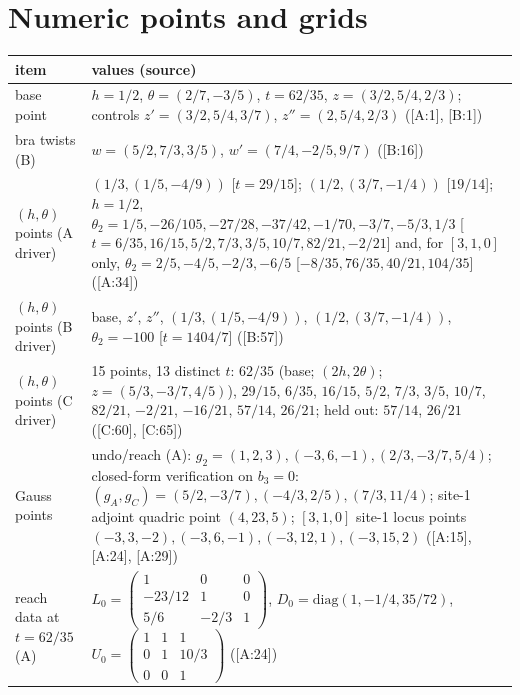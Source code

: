 \documentclass[10pt]{article}
\newcommand{\cl}[2]{\textsf{[#1:#2]}}
\begin{document}
\section{Numeric points and grids}\label{app:points}

\begin{center}\small\setlength{\tabcolsep}{3pt}\begin{longtable}{@{}p{3.2cm}p{13.2cm}@{}}\toprule
\textbf{item} & \textbf{values (source)} \\\midrule\endhead
base point & $h=1/2$, $\theta=(2/7,-3/5)$, $t=62/35$, $z=(3/2,5/4,2/3)$; controls $z'=(3/2,5/4,3/7)$, $z''=(2,5/4,2/3)$ (\cl{A}{1}, \cl{B}{1}) \\
bra twists (B) & $w=(5/2,7/3,3/5)$, $w'=(7/4,-2/5,9/7)$ (\cl{B}{16}) \\
$(h,\theta)$ points (A driver) & $(1/3,(1/5,-4/9))$ [$t=29/15$]; $(1/2,(3/7,-1/4))$ [$19/14$]; $h=1/2$, $\theta_2=1/5,-26/105,-27/28,-37/42,-1/70,-3/7,-5/3,1/3$ [$t=6/35,16/15,5/2,7/3,3/5,10/7,82/21,-2/21$] and, for $[3,1,0]$ only, $\theta_2=2/5,-4/5,-2/3,-6/5$ [$-8/35,76/35,40/21,104/35$] (\cl{A}{34}) \\
$(h,\theta)$ points (B driver) & base, $z'$, $z''$, $(1/3,(1/5,-4/9))$, $(1/2,(3/7,-1/4))$, $\theta_2=-100$ [$t=1404/7$] (\cl{B}{57}) \\
$(h,\theta)$ points (C driver) & 15 points, 13 distinct $t$: $62/35$ (base; $(2h,2\theta)$; $z=(5/3,-3/7,4/5)$), $29/15$, $6/35$, $16/15$, $5/2$, $7/3$, $3/5$, $10/7$, $82/21$, $-2/21$, $-16/21$, $57/14$, $26/21$; held out: $57/14$, $26/21$ (\cl{C}{60}, \cl{C}{65}) \\
Gauss points & undo/reach (A): $g_2=(1,2,3),(-3,6,-1),(2/3,-3/7,5/4)$; closed-form verification on $b_3=0$: $(g_A,g_C)=(5/2,-3/7),(-4/3,2/5),(7/3,11/4)$; site-1 adjoint quadric point $(4,23,5)$; $[3,1,0]$ site-1 locus points $(-3,3,-2),(-3,6,-1),(-3,12,1),(-3,15,2)$ (\cl{A}{15}, \cl{A}{24}, \cl{A}{29}) \\
reach data at $t=62/35$ (A) & $L_0=\left(\begin{smallmatrix}1&0&0\\-23/12&1&0\\5/6&-2/3&1\end{smallmatrix}\right)$, $D_0=\mathrm{diag}(1,-1/4,35/72)$, $U_0=\left(\begin{smallmatrix}1&1&1\\0&1&10/3\\0&0&1\end{smallmatrix}\right)$ (\cl{A}{24}) \\

\end{longtable}
\end{center}
\end{document}
